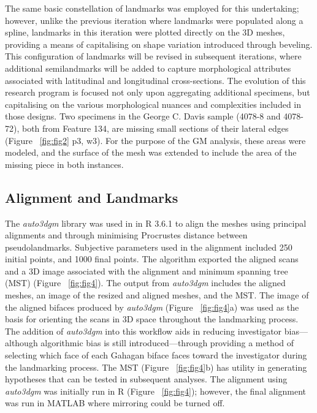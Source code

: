 \documentclass[review]{elsarticle}
\begin{document}
The same basic constellation of landmarks was employed for this undertaking; however, unlike the previous iteration where landmarks were populated along a spline, landmarks in this iteration were plotted directly on the 3D meshes, providing a means of capitalising on shape variation introduced through beveling. This configuration of landmarks will be revised in subsequent iterations, where additional semilandmarks will be added to capture morphological attributes associated with latitudinal and longitudinal cross-sections. The evolution of this research program is focused not only upon aggregating additional specimens, but capitalising on the various morphological nuances and complexities included in those designs. Two specimens in the George C. Davis sample (4078-8 and 4078-72), both from Feature 134, are missing small sections of their lateral edges (Figure ~\ref{fig:fig2} p3, w3). For the purpose of the GM analysis, these areas were modeled, and the surface of the mesh was extended to include the area of the missing piece in both instances.

\subsection*{Alignment and Landmarks}

The \textit{auto3dgm} library \citep{RN20822} was used in in R 3.6.1 \citep{R} to align the meshes using principal alignments and through minimising Procrustes distance between pseudolandmarks. Subjective parameters used in the alignment included 250 initial points, and 1000 final points. The algorithm exported the aligned scans and a 3D image associated with the alignment and minimum spanning tree (MST) (Figure ~\ref{fig:fig4}). The output from \textit{auto3dgm} includes the aligned meshes, an image of the resized and aligned meshes, and the MST. The image of the aligned bifaces produced by \textit{auto3dgm} (Figure ~\ref{fig:fig4}a) was used as the basis for orienting the scans in 3D space throughout the landmarking process. The addition of \textit{auto3dgm} into this workflow aids in reducing investigator bias---although algorithmic bias is still introduced---through providing a method of selecting which face of each Gahagan biface faces toward the investigator during the landmarking process. The MST (Figure ~\ref{fig:fig4}b) has utility in generating hypotheses that can be tested in subsequent analyses. The alignment using \textit{auto3dgm} was initially run in R (Figure ~\ref{fig:fig4}); however, the final alignment was run in MATLAB where mirroring could be turned off.
\end{document}
